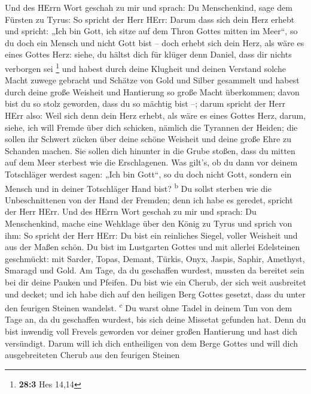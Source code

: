  Und des HErrn Wort geschah zu mir und sprach:
 Du Menschenkind, sage dem Fürsten zu Tyrus: So spricht
der Herr HErr: Darum dass sich dein Herz erhebt und spricht: „Ich bin
Gott, ich sitze auf dem Thron Gottes mitten im Meer``, so du doch ein
Mensch und nicht Gott bist -- doch erhebt sich dein Herz, als wäre es
eines Gottes Herz:  siehe, du hältst dich für klüger denn
Daniel, dass dir nichts verborgen sei \footnote{\textbf{28:3} Hes 14,14}
 und habest durch deine Klugheit und deinen Verstand
solche Macht zuwege gebracht und Schätze von Gold und Silber gesammelt
 und habest durch deine große Weisheit und Hantierung so
große Macht überkommen; davon bist du so stolz geworden, dass du so
mächtig bist --;  darum spricht der Herr HErr also: Weil
sich denn dein Herz erhebt, als wäre es eines Gottes Herz,
 darum, siehe, ich will Fremde über dich schicken, nämlich
die Tyrannen der Heiden; die sollen ihr Schwert zücken über deine schöne
Weisheit und deine große Ehre zu Schanden machen.  Sie
sollen dich hinunter in die Grube stoßen, dass du mitten auf dem Meer
sterbest wie die Erschlagenen.  Was gilt's, ob du dann vor
deinem Totschläger werdest sagen: „Ich bin Gott``, so du doch nicht
Gott, sondern ein Mensch und in deiner Totschläger Hand bist?
\textsuperscript{b}  Du sollst sterben wie die
Unbeschnittenen von der Hand der Fremden; denn ich habe es geredet,
spricht der Herr HErr.  Und des HErrn Wort geschah zu mir
und sprach:  Du Menschenkind, mache eine Wehklage über
den König zu Tyrus und sprich von ihm: So spricht der Herr HErr: Du bist
ein reinliches Siegel, voller Weisheit und aus der Maßen schön.
 Du bist im Lustgarten Gottes und mit allerlei
Edelsteinen geschmückt: mit Sarder, Topas, Demant, Türkis, Onyx, Jaspis,
Saphir, Amethyst, Smaragd und Gold. Am Tage, da du geschaffen wurdest,
mussten da bereitet sein bei dir deine Pauken und Pfeifen.
 Du bist wie ein Cherub, der sich weit ausbreitet und
decket; und ich habe dich auf den heiligen Berg Gottes gesetzt, dass du
unter den feurigen Steinen wandelst. \textsuperscript{c} 
Du warst ohne Tadel in deinem Tun von dem Tage an, da du geschaffen
wurdest, bis sich deine Missetat gefunden hat.  Denn du
bist inwendig voll Frevels geworden vor deiner großen Hantierung und
hast dich versündigt. Darum will ich dich entheiligen von dem Berge
Gottes und will dich ausgebreiteten Cherub aus den feurigen Steinen

